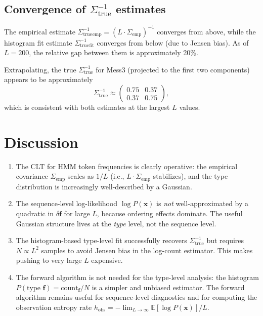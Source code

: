 \documentclass[11pt]{article}
\newcommand{\vf}{\mathbf{f}}
\newcommand{\vx}{\mathbf{x}}
\newcommand{\Strue}{\Sigma_{\mathrm{true}}}
\begin{document}
\subsection{Convergence of $\Strue^{-1}$ estimates}

The empirical estimate $\Strue^{-1}_{\mathrm{emp}} = (L \cdot \Sigma_{\mathrm{emp}})^{-1}$ converges from above, while the histogram fit estimate $\Strue^{-1}_{\mathrm{fit}}$ converges from below (due to Jensen bias). As of $L = 200$, the relative gap between them is approximately 20\%.

Extrapolating, the true $\Strue^{-1}$ for Mess3 (projected to the first two components) appears to be approximately
\begin{equation}
  \Strue^{-1} \approx \begin{pmatrix} 0.75 & 0.37 \\ 0.37 & 0.75 \end{pmatrix},
\end{equation}
which is consistent with both estimates at the largest $L$ values.

\section{Discussion}

\begin{enumerate}
  \item The CLT for HMM token frequencies is clearly operative: the empirical covariance $\Sigma_{\mathrm{emp}}$ scales as $1/L$ (i.e., $L \cdot \Sigma_{\mathrm{emp}}$ stabilizes), and the type distribution is increasingly well-described by a Gaussian.

  \item The sequence-level log-likelihood $\log P(\vx)$ is \emph{not} well-approximated by a quadratic in $\delta\vf$ for large $L$, because ordering effects dominate. The useful Gaussian structure lives at the \emph{type} level, not the sequence level.

  \item The histogram-based type-level fit successfully recovers $\Strue^{-1}$ but requires $N \propto L^2$ samples to avoid Jensen bias in the log-count estimator. This makes pushing to very large $L$ expensive.

  \item The forward algorithm is not needed for the type-level analysis: the histogram $P(\text{type } \vf) = \text{count}_\vf / N$ is a simpler and unbiased estimator. The forward algorithm remains useful for sequence-level diagnostics and for computing the observation entropy rate $h_{\mathrm{obs}} = -\lim_{L \to \infty} \mathbb{E}[\log P(\vx)] / L$.
\end{enumerate}
\end{document}

